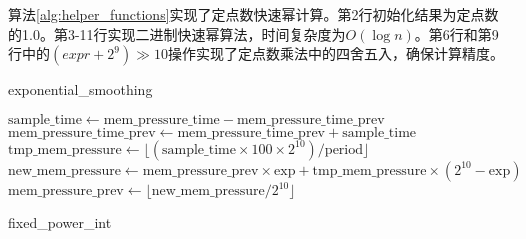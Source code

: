 算法\ref{alg:helper_functions}实现了定点数快速幂计算。第2行初始化结果为定点数的1.0。第3-11行实现二进制快速幂算法，时间复杂度为$O(\log n)$。第6行和第9行中的$(expr + 2^9) \gg 10$操作实现了定点数乘法中的四舍五入，确保计算精度。
\begin{algorithm}[htbp]
\caption{exponential\_smoothing}
\label{alg:exponential_smoothing}
\SetAlgoLined
\DontPrintSemicolon
{}

\(\text{sample\_time}\gets \text{mem\_pressure\_time}-\text{mem\_pressure\_time\_prev}\)\;
\(\text{mem\_pressure\_time\_prev} \gets \text{mem\_pressure\_time\_prev} + \text{sample\_time}\)\;
\(\text{tmp\_mem\_pressure}\gets \lfloor(\text{sample\_time}\times 100\times 2^{10})/\text{period}\rfloor\)\;
\(\text{new\_mem\_pressure}\gets \text{mem\_pressure\_prev}\times \text{exp} + \text{tmp\_mem\_pressure}\times(2^{10}-\text{exp})\)\;
\(\text{mem\_pressure\_prev}\gets \lfloor \text{new\_mem\_pressure}/2^{10}\rfloor\)\;
\end{algorithm}
\begin{algorithm}[htbp]
    \caption{fixed\_power\_int}
    \label{alg:helper_functions}

\end{algorithm}




